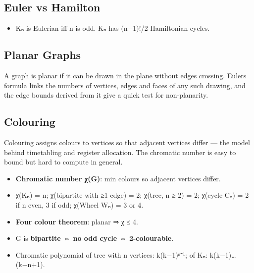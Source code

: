 

\needspace{95pt}

\hypertarget{p2-01--52-euler-vs-hamilton}{%
\subsection{Euler vs Hamilton}\label{p2-01--52-euler-vs-hamilton}}



\begin{itemize}
\tightlist
\item
  Kₙ is Eulerian iff n is odd. Kₙ has (n−1)!/2 Hamiltonian cycles.
\end{itemize}

\needspace{125pt}

\hypertarget{p2-01--53-planar-graphs}{%
\subsection{Planar Graphs}\label{p2-01--53-planar-graphs}}

A graph is planar if it can be drawn in the plane without edges crossing. Euler\textquotesingle s formula links the
numbers of vertices, edges and faces of any such drawing, and the edge bounds derived from it give a quick
test for non-planarity.





\needspace{125pt}

\hypertarget{p2-01--54-colouring}{%
\subsection{Colouring}\label{p2-01--54-colouring}}

Colouring assigns colours to vertices so that adjacent vertices differ --- the model behind timetabling and
register allocation. The chromatic number is easy to bound but hard to compute in general.

\begin{itemize}
\tightlist
\item
  \textbf{Chromatic number χ(G)}: min colours so adjacent vertices differ.
\item
  χ(Kₙ) = n; χ(bipartite with ≥1 edge) = 2; χ(tree, n ≥ 2) = 2; χ(cycle Cₙ) = 2 if n even, 3 if odd; χ(Wheel Wₙ) = 3 or 4.
\item
  \textbf{Four colour theorem}: planar ⇒ χ ≤ 4.
\item
  G is \textbf{bipartite ⇔ no odd cycle ⇔ 2-colourable}.
\item
  Chromatic polynomial of tree with n vertices: k(k−1)ⁿ⁻¹; of Kₙ: k(k−1)\ldots(k−n+1).
\end{itemize}


